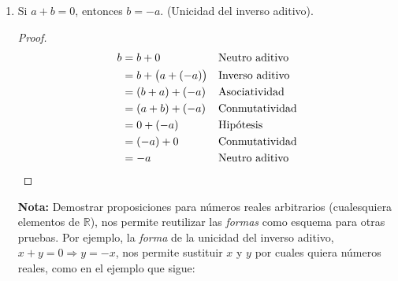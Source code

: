 \documentclass[11pt]{article}
\newcommand{\R}{\mathbb{R}}
\begin{document}
\begin{enumerate}[label=\alph*)]
    \item Si $a+b=0$, entonces $b=-a$. (Unicidad del inverso aditivo).
    \vspace{-1em}\begin{proof}
    \begin{align*}
            b &= b + 0 && \text{Neutro aditivo}\\
            &= b + \bigl(a+(-a)\bigr) && \text{Inverso aditivo}\\
            &= (b+a) + (-a) && \text{Asociatividad}\\
            &= (a+b) + (-a) && \text{Conmutatividad}\\
            &= 0 + (-a) && \text{Hipótesis}\\
            &= (-a) + 0 && \text{Conmutatividad}\\
            &= -a && \text{Neutro aditivo} \qedhere
        \end{align*}
    \end{proof} \vspace{-1em}
    \textbf{Nota:} Demostrar proposiciones para números reales arbitrarios (cualesquiera elementos de $\R$), nos permite reutilizar las \textit{formas} como esquema para otras pruebas. Por ejemplo, la \textit{forma} de la unicidad del inverso aditivo, $x+y=0 \Longrightarrow y=-x$, nos permite sustituir $x$ y $y$ por cuales quiera números reales, como en el ejemplo que sigue:
    

\end{enumerate}
\end{document}
